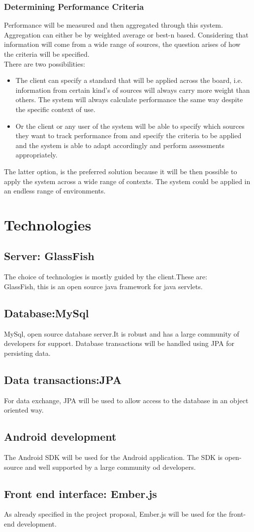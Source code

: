 \documentclass[a4paper,12pt]{article}
\begin{document}
\subsubsection{Determining Performance Criteria}
Performance will be measured and then aggregated through this system. Aggregation can either be by weighted average or best-n based. Considering that information will come from a wide range of sources, the question arises of how the criteria will be specified. \\
There are two possibilities:
\begin{itemize}
\item The client can specify a standard that will be applied across the board, i.e. information from certain kind's of sources will always carry more weight than others. The system will always calculate performance the same way despite the specific context of use.
\item Or the client or any user of the system will be able to specify which sources they want to track performance from and specify the criteria to be applied and the system is able to adapt accordingly and perform assessments appropriately. 
\end{itemize}
The latter option, is the preferred solution because it will be then possible to apply the system across a wide range of contexts. The system could be applied in an endless range of environments.
\section{Technologies}
\subsection{Server: GlassFish}
The choice of technologies is mostly guided by the client.These are:\\
GlassFish, this is an open source java framework for java servlets.
\subsection{Database:MySql}
MySql, open source database server.It is robust and has a large community of developers for support.
Database transactions will be handled using JPA for persisting data.
\subsection{Data transactions:JPA}
For data exchange, JPA will be used to allow access to the database in an object oriented way.
\subsection{Android development}
The Android SDK will be used for the Android application. The SDK is open-source and well supported by a large community od developers.
\subsection{Front end interface: Ember.js}
As already specified in the project proposal, Ember.js will be used for the front-end development.
\end{document}
